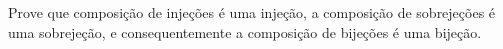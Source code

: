\begin{exercise}
	Prove que composição de injeções é uma injeção, a composição de sobrejeções é uma sobrejeção, e consequentemente a composição de bijeções é uma bijeção.
\end{exercise}

